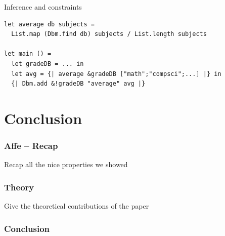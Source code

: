 \documentclass[aspectratio=169,dvipsnames,svgnames,10pt]{beamer}
\begin{document}
\begin{frame}[fragile]{Inference and constraints}

  
\begin{verbatim}
let average db subjects = 
  List.map (Dbm.find db) subjects / List.length subjects

let main () =
  let gradeDB = ... in
  let avg = {| average &gradeDB ["math";"compsci";...] |} in
  {| Dbm.add &!gradeDB "average" avg |}
\end{verbatim}
   
\end{frame}

\section*{Conclusion}

\begin{frame}
  \frametitle{Affe -- Recap}
  Recap all the nice properties we showed
\end{frame}

\begin{frame}
  \frametitle{Theory}
  Give the theoretical contributions of the paper
\end{frame}

\begin{frame}
  \frametitle{Conclusion}
  
\end{frame}


\end{document}
